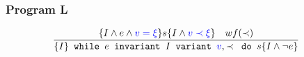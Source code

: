 \begin{frame}[containsverbatim]
  \frametitle{Program L}
\begin{align*}
  &\frac{
    \{I \land e \land \textcolor{blue}{v = \xi} \} s \{I \land \textcolor{blue}{v \prec \xi} \} \quad wf(\prec)
  }{
    \{I\} \texttt{ while } e \texttt{ invariant } I
          \texttt{ variant } \textcolor{blue}{v}, \prec \texttt{ do } s \{I \land \neg e\}
  }
\end{align*}
\\~\\
\\~\\
\\~\\
\\~\\
\\~\\
\\~\\
\\~\\
\\~\\
\\~\\
\\~\\
\\~\\
\\~\\
\\~\\
\\~\\
\\~\\
\\~\\
\\~\\
\\~\\
\\~\\
\end{frame}

